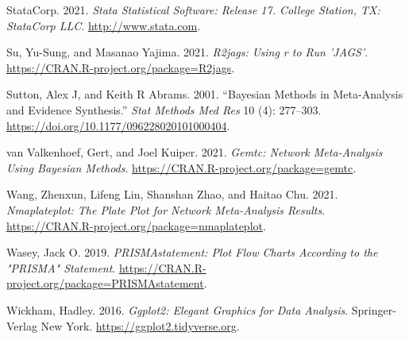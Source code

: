 \begin{CSLReferences}{1}{0}
\leavevmode{}%
StataCorp. 2021. \emph{{Stata Statistical Software: Release 17}. College Station, TX: StataCorp LLC}. \url{http://www.stata.com}.

\leavevmode{}%
Su, Yu-Sung, and Masanao Yajima. 2021. \emph{R2jags: Using r to Run 'JAGS'}. \url{https://CRAN.R-project.org/package=R2jags}.

\leavevmode{}%
Sutton, Alex J, and Keith R Abrams. 2001. {``Bayesian Methods in Meta-Analysis and Evidence Synthesis.''} \emph{Stat Methods Med Res} 10 (4): 277--303. \url{https://doi.org/10.1177/096228020101000404}.

\leavevmode{}%
van Valkenhoef, Gert, and Joel Kuiper. 2021. \emph{Gemtc: Network Meta-Analysis Using Bayesian Methods}. \url{https://CRAN.R-project.org/package=gemtc}.

\leavevmode{}%
Wang, Zhenxun, Lifeng Lin, Shanshan Zhao, and Haitao Chu. 2021. \emph{Nmaplateplot: The Plate Plot for Network Meta-Analysis Results}. \url{https://CRAN.R-project.org/package=nmaplateplot}.

\leavevmode{}%
Wasey, Jack O. 2019. \emph{PRISMAstatement: Plot Flow Charts According to the "PRISMA" Statement}. \url{https://CRAN.R-project.org/package=PRISMAstatement}.

\leavevmode{}%
Wickham, Hadley. 2016. \emph{Ggplot2: Elegant Graphics for Data Analysis}. Springer-Verlag New York. \url{https://ggplot2.tidyverse.org}.

\end{CSLReferences}



\address{%
Loukia M. Spineli\\
Midwifery Research and Education Unit\\%
Hannover Medical School\\ Carl-Neuber-Strasse 1, 30625, Hannover, Germany\\
%
\url{https://www.github.com/LoukiaSpin}\\%
\textit{ORCiD: \href{https://orcid.org/0000-0001-9515-582X}{0000-0001-9515-582X}}\\%
\href{mailto:Spineli.Loukia@mh-hannover.de}{\nolinkurl{Spineli.Loukia@mh-hannover.de}}%
}

\address{%
Chrysostomos Kalyvas\\
Biostatistics and Research Decision Sciences\\%
MSD Europe Inc., Brussels, Belgium\\
%
\url{https://www.github.com/ckalyvas}\\%
\textit{ORCiD: \href{https://orcid.org/0000-0003-0606-4518}{0000-0003-0606-4518}}\\%
\href{mailto:chrysostomos.kalyvas@merck.com}{\nolinkurl{chrysostomos.kalyvas@merck.com}}%
}

